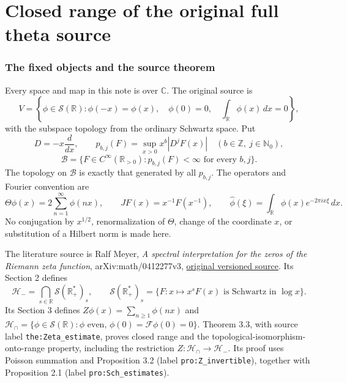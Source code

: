 \documentclass[11pt]{article}
\begin{document}
\endgroup

\clearpage\begingroup
\part*{Closed range of the original full theta source}
\newtheorem{lthetatheorem}{Theorem}
\newtheorem{lthetalemma}[lthetatheorem]{Lemma}
\newtheorem{lthetaproposition}[lthetatheorem]{Proposition}
\newtheorem{lthetacorollary}[lthetatheorem]{Corollary}
\newcommand{\lthetaB}{\mathscr B}
\newcommand{\lthetaSch}{\mathcal S}
\newcommand{\lthetaHH}{\mathcal H}
\newcommand{\lthetaZ}{\mathbb Z}
\newcommand{\lthetaR}{\mathbb R}
\newcommand{\lthetaC}{\mathbb C}
\newcommand{\lthetaN}{\mathbb N}
\newcommand{\lthetaid}{\operatorname{id}}
\newcommand{\lthetacl}{\operatorname{cl}}
\newcommand{\lthetasupp}{\operatorname{supp}}
\newcommand{\lthetaF}{\mathcal F}



\section{The fixed objects and the source theorem}

Every space and map in this note is over $\lthetaC$. The original source is
\[
 V=\left\{\phi\in\lthetaSch(\lthetaR):\phi(-x)=\phi(x),\quad
       \phi(0)=0,\quad \int_\lthetaR\phi(x)\,dx=0\right\},
\]
with the subspace topology from the ordinary Schwartz space. Put
\[
 D=-x\frac{d}{dx},\qquad
 p_{b,j}(F)=\sup_{x>0}x^b|D^jF(x)|\quad(b\in\lthetaZ,\ j\in\lthetaN_0),
\]
\[
 \lthetaB=\{F\in C^\infty(\lthetaR_{>0}):p_{b,j}(F)<\infty
                     \text{ for every }b,j\}.
\]
The topology on $\lthetaB$ is exactly that generated by all $p_{b,j}$. The
operators and Fourier convention are
\begin{equation}\label{ltheta:eq:original}
 \Theta\phi(x)=2\sum_{n=1}^{\infty}\phi(nx),\qquad
 JF(x)=x^{-1}F(x^{-1}),\qquad
 \widehat\phi(\xi)=\int_\lthetaR\phi(x)e^{-2\pi i x\xi}\,dx.
\end{equation}
No conjugation by $x^{1/2}$, renormalization of $\Theta$, change of the
coordinate $x$, or substitution of a Hilbert norm is made here.

The literature source is Ralf Meyer, \emph{A spectral interpretation for
the zeros of the Riemann zeta function}, arXiv:math/0412277v3,
\href{https://arxiv.org/abs/math/0412277v3}{original versioned source}.
Its Section 2 defines
\[
 \lthetaHH_- =\bigcap_{s\in\lthetaR}\lthetaSch(\lthetaR_+^*)_s,\qquad
 \lthetaSch(\lthetaR_+^*)_s=
 \{F:x\mapsto x^sF(x)\text{ is Schwartz in }\log x\}.
\]
Its Section 3 defines $Z\phi(x)=\sum_{n\geq1}\phi(nx)$ and
$\lthetaHH_\cap=\{\phi\in\lthetaSch(\lthetaR):\phi\text{ even},\,
\phi(0)=\lthetaF\phi(0)=0\}$. Theorem 3.3, with source label
\texttt{the:Zeta\_estimate}, proves closed range and the
topological-isomorphism-onto-range property, including the restriction
$Z:\lthetaHH_\cap\to\lthetaHH_-$. Its proof uses Poisson summation and
Proposition 3.2 (label \texttt{pro:Z\_invertible}), together with
Proposition 2.1 (label \texttt{pro:Sch\_estimates}).
\end{document}
